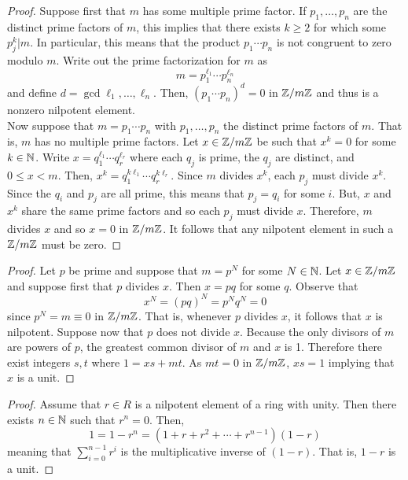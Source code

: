 \documentclass[../AlgebraQualSolutions.tex]{subfiles}
\begin{document}
\begin{proof}
    Suppose first that $m$ has some multiple prime factor. If $p_1,\ldots, p_n$ are the distinct prime factors of $m$, this implies that there exists $k \geq 2$ for which some $p_j^k | m$. In particular, this means that the product $p_1 \cdots p_n$ is not congruent to zero modulo $m$. Write out the prime factorization for $m$ as 
		\[m = p_1^{\ell_1} \cdots p_n^{\ell_n}\]
	and define $d = \gcd{\ell_1,\ldots, \ell_n}$. Then, $(p_1\cdots p_n)^d = 0$ in $\mathbb{Z}/m\mathbb{Z}$ and thus is a nonzero nilpotent element.\\

	Now suppose that $m = p_1 \cdots p_n$ with $p_1,\ldots, p_n$ the distinct prime factors of $m$. That is, $m$ has no multiple prime factors. Let $x \in \mathbb{Z}/m\mathbb{Z}$ be such that $x^k = 0$ for some $k \in \mathbb{N}$. Write $x = q_1^{\ell_1} \cdots q_r^{\ell_r}$ where each $q_j$ is prime, the $q_j$ are distinct, and $0 \leq x < m$. Then, $x^k = q_1^{k\ell_1} \cdots q_r^{k\ell_r}$. Since $m$ divides $x^k$, each $p_j$ must divide $x^k$. Since the $q_i$ and $p_j$ are all prime, this means that $p_j = q_i$ for some $i$. But, $x$ and $x^k$ share the same prime factors and so each $p_j$ must divide $x$. Therefore, $m$ divides $x$ and so $x = 0$ in $\mathbb{Z}/m\mathbb{Z}$. It follows that any nilpotent element in such a $\mathbb{Z}/m\mathbb{Z}$ must be zero.
\end{proof}

\begin{proof}
    Let $p$ be prime and suppose that $m = p^N$ for some $N \in \mathbb{N}$. Let $x \in \mathbb{Z}/m\mathbb{Z}$ and suppose first that $p$ divides $x$. Then $x = pq$ for some $q$. Observe that
        \[x^N = (pq)^N = p^Nq^N = 0\]
    since $p^N = m \equiv 0$ in $\mathbb{Z}/m\mathbb{Z}$. That is, whenever $p$ divides $x$, it follows that $x$ is nilpotent. Suppose now that $p$ does not divide $x$. Because the only divisors of $m$ are powers of $p$, the greatest common divisor of $m$ and $x$ is 1. Therefore there exist integers $s,t$ where $1 = xs + mt$. As $mt = 0$ in $\mathbb{Z}/m\mathbb{Z}$, $xs = 1$ implying that $x$ is a unit.
\end{proof}

\begin{proof}
    Assume that $r \in R$ is a nilpotent element of a ring with unity. Then there exists $n \in \mathbb{N}$ such that $r^n = 0$. Then,
        \[1 = 1 - r^n = (1 + r + r^2 + \cdots + r^{n-1})(1-r)\]
    meaning that $\sum_{i=0}^{n-1}r^i$ is the multiplicative inverse of $(1-r)$. That is, $1-r$ is a unit.
\end{proof}
\end{document}
